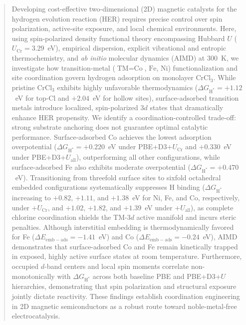 \documentclass[journal=jacsat,manuscript=article]{achemso}
\begin{document}
\begin{abstract}

  {\color{revcolor}%
    Developing cost-effective two-dimensional (2D) magnetic catalysts for the hydrogen evolution reaction (HER) requires precise control over spin polarization, active-site exposure, and local chemical environments. Here, using spin-polarized density functional theory encompassing Hubbard $U$ ($U_{\text{Cr}} = 3.29$~eV), empirical dispersion, explicit vibrational and entropic thermochemistry, and \textit{ab initio} molecular dynamics (AIMD) at 300~K, we investigate how transition-metal ($\text{TM} = \text{Co}$, $\text{Fe}$, $\text{Ni}$) functionalization and site coordination govern hydrogen adsorption on monolayer $\text{CrCl}_3$. While pristine $\text{CrCl}_3$ exhibits highly unfavorable thermodynamics ($\Delta G_{\text{H}^*} = +1.12$~eV for top-Cl and $+2.04$~eV for hollow sites), surface-adsorbed transition metals introduce localized, spin-polarized $3d$ states that dramatically enhance HER propensity.
    {\color{revcolor}%
      We identify a coordination-controlled trade-off: strong substrate anchoring does not guarantee optimal catalytic performance. Surface-adsorbed Co achieves the lowest adsorption overpotential ($\Delta G_{\text{H}^*} = +0.220$~eV under PBE+D3+$U_{\text{Cr}}$ and $+0.330$~eV under PBE+D3+$U_{\text{all}}$), outperforming all other configurations, while surface-adsorbed Fe also exhibits moderate overpotential ($\Delta G_{\text{H}^*} = +0.470$~eV).
    }
    Transitioning from threefold surface sites to sixfold octahedral embedded configurations systematically suppresses H binding ($\Delta G_{\text{H}^*}$ increasing to $+0.82$, $+1.11$, and $+1.38$~eV for Ni, Fe, and Co, respectively, under $+U_{\text{Cr}}$, and $+1.02$, $+1.82$, and $+1.39$~eV under $+U_{\text{all}}$), as complete chlorine coordination shields the TM-$3d$ active manifold and incurs steric penalties. Although interstitial embedding is thermodynamically favored for Fe ($\Delta E_{\mathrm{emb-ads}} = -1.41$~eV) and Co ($\Delta E_{\mathrm{emb-ads}} = -0.24$~eV), AIMD demonstrates that surface-adsorbed Co and Fe remain kinetically trapped in exposed, highly active surface states at room temperature. Furthermore, occupied $d$-band centers and local spin moments correlate non-monotonically with $\Delta G_{\text{H}^*}$ across both baseline PBE and PBE+D3+$U$ hierarchies, demonstrating that spin polarization and structural exposure jointly dictate reactivity. These findings establish coordination engineering in 2D magnetic semiconductors as a robust route toward noble-metal-free electrocatalysis.
  }
\end{abstract}
\end{document}
